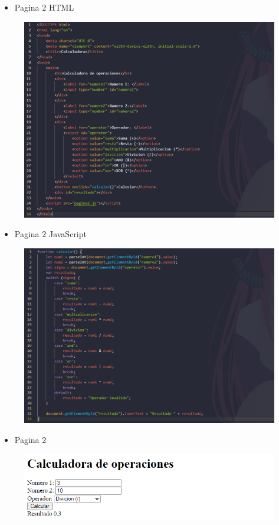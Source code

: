 \documentclass{article}
\begin{document}
	\clearpage
	\begin{itemize}
		\item Pagina 2 HTML
	\end{itemize}
	\begin{figure}[H]
		\centering
		\includegraphics[width=1.0\textwidth, keepaspectratio]{img/pagina2a}
	\end{figure}
	\begin{itemize}
		\item Pagina 2 JavaScript
	\end{itemize}
	\begin{figure}[H]
		\centering
		\includegraphics[width=1.0\textwidth, keepaspectratio]{img/pagina2b}
	\end{figure}
	\begin{itemize}
		\item Pagina 2
	\end{itemize}
	\begin{figure}[H]
		\centering
		\includegraphics[width=1.0\textwidth, keepaspectratio]{img/pagina2c}
	\end{figure}
	\clearpage
\end{document}
